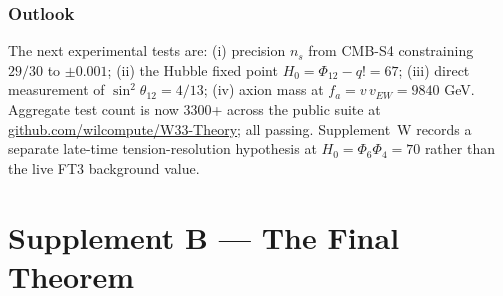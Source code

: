 \documentclass[12pt,a4paper]{article}
\def\textbf#1{#1}%
\def\texttt#1{#1}%
\def\Phi#1{Phi#1}%
\theoremstyle{definition}
\newcommand{\Phitwelve}{\Phi_{12}}
\begin{document}





























\section{Outlook}
The next experimental tests are: (i) precision $n_s$ from CMB-S4
constraining $29/30$ to $\pm 0.001$; (ii) the Hubble fixed point
$H_0=\Phitwelve-q!=67$; (iii) direct measurement of
$\sin^2\theta_{12}=4/13$; (iv) axion mass at $f_a=v\,v_{EW}=9840$
GeV. Aggregate test count is now \textbf{3300+} across the public
suite at \href{https://github.com/wilcompute/W33-Theory}{\texttt{github.com/wilcompute/W33-Theory}}; all passing.
Supplement~W records a separate late-time tension-resolution hypothesis at
$H_0=\Phi_6\Phi_4=70$ rather than the live FT3 background value.

\clearpage
\part*{Supplement B --- The Final Theorem}
\end{document}
